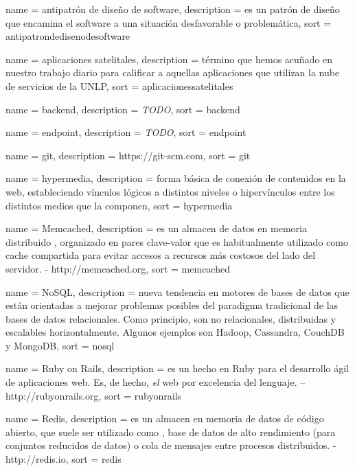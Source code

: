  {
  name = {antipatrón de diseño de software},
  description = {es un patrón de diseño que encamina el software a una situación desfavorable o problemática},
  sort = {antipatrondedisenodesoftware}
}

 {
  name = {aplicaciones satelitales},
  description = {término que hemos acuñado en nuestro trabajo diario para calificar a aquellas aplicaciones que utilizan la nube de servicios de la UNLP},
  sort = {aplicacionessatelitales}
}

 {
  name = {backend},
  description = {\textit{TODO}},
  sort = {backend}
}

 {
  name = {endpoint},
  description = {\textit{TODO}},
  sort = {endpoint}
}

 {
  name = {git},
  description = {https://git-scm.com},
  sort = {git}
}

 {
  name = {hypermedia},
  description = {forma básica de conexión de contenidos en la web, estableciendo vínculos lógicos a distintos niveles o hipervínculos entre los distintos medios que la componen},
  sort = {hypermedia}
}

 {
  name = {Memcached},
  description = {es un almacen de datos en memoria distribuido , organizado en pares clave-valor que es habitualmente utilizado como cache compartida para evitar accesos a recursos más costosos del lado del servidor. - http://memcached.org},
  sort = {memcached}
}

 {
  name = {NoSQL},
  description = {nueva tendencia en motores de bases de datos que están orientadas a mejorar problemas posibles del paradigma tradicional de las bases de datos relacionales. Como principio, son no relacionales, distribuidas y escalables horizontalmente. Algunos ejemplos son Hadoop, Cassandra, CouchDB y MongoDB},
  sort = {nosql}
}

 {
  name = {Ruby on Rails},
  description = {es un  hecho en Ruby para el desarrollo ágil de aplicaciones web. Es, de hecho, \textit{el}  web por excelencia del lenguaje. – http://rubyonrails.org},
  sort = {rubyonrails}
}

 {
  name = {Redis},
  description = {es un almacen en memoria de datos de código abierto, que suele ser utilizado como , base de datos de alto rendimiento (para conjuntos reducidos de datos) o cola de mensajes entre procesos distribuidos. - http://redis.io},
  sort = {redis}
}

